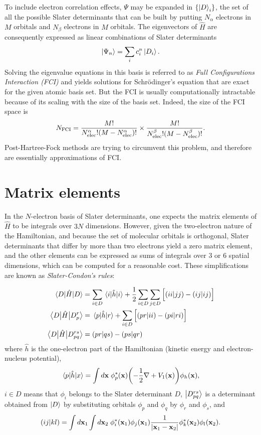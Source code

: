 \documentclass[./thesis.tex]{subfiles}
\begin{document}
To include electron correlation effects, $\Psi$ may be expanded in
$\{\ket D_i \}$, the set of all the possible Slater determinants that can be built by putting $N_\alpha$ electrons in $M$ orbitals and $N_\beta$ electrons in $M$ orbitals.
The eigenvectors of $\widehat{H}$ are consequently expressed as linear combinations of Slater determinants 
\begin{equation}
\ket{\Psi_n} = \sum_{i} c_i^n \ket{D_i}.
\end{equation}
Solving the eigenvalue equations in this basis is referred to as \emph{Full Configurations Interaction (FCI)} and yields solutions for Schrödinger's equation that are exact for the given atomic basis set.
But the FCI is usually computationally intractable because of its scaling with the size of the basis set. Indeed, the size of the FCI space is
\begin{equation}
N_\text{FCI} = \frac{M!}{{N_\text{elec}^\alpha} ! (M-{N_\text{elec}^\alpha})!} \times \frac{M!}{{N_\text{elec}^\beta} ! (M-{N_\text{elec}^\beta})!}.
\end{equation}
Post-Hartree-Fock methods are trying to circumvent this problem, and therefore
are essentially approximations of FCI.

\section{Matrix elements}
In the $N$-electron basis of Slater determinants, one expects the matrix elements of $\widehat H$ to be integrals over $3N$ dimensions.
However, given the two-electron nature of the Hamiltonian, and because the set of molecular orbitals is orthogonal, Slater determinants that differ by more than two electrons yield a zero matrix element, and the other elements can be expressed as sums of integrals over 3 or 6 spatial dimensions, which can be computed for a reasonable cost. These simplifications are known as \emph{Slater-Condon's rules}:

\begin{align}
\mel{D}{\hat{H}}{D} & = \sum_{i\in D} \mel{i}{\hat{h}}{i} + \frac{1}{2} \sum_{i\in D} \sum_{j\in D} \Big [ (ii|jj) - (ij|ij) \Big ]      \\
\mel{D}{\hat{H}}{D_p^r} & = \mel{p}{\hat{h}}{r} + \sum_{i\in D} \Big [ (pr|ii) - (pi|ri) \Big ]        \\
\mel{D}{\hat{H}}{D_{pq}^{rs}} & = (pr|qs) - (ps|qr)
\end{align}
where $\hat{h}$ is the one-electron part of the Hamiltonian (kinetic energy and
electron-nucleus potential),
\begin{equation}
\mel{p}{\hat{h}}{x} = \int d{\bf x}\; \phi^*_p(\mathbf{x}) \qty( -\frac{1}{2}\nabla + V_1(\mathbf{x})) \phi_h(\mathbf{x}),
\end{equation}
$i \in D$ means that $\phi_i$ belongs to the
Slater determinant $D$, $\ket {D_{pq}^{rs}}$ is a determinant obtained from $\ket
D$ by substituting orbitals $\phi_p$ and $\phi_q$ by $\phi_r$ and
$\phi_s$, and
\begin{equation}
(ij|kl) = \int d{\bf x}_1 \int d{\bf x}_2 \; \phi^*_i({\bf x}_1)\phi_j({\bf x}_1) \frac{1}{|{\bf x}_1 - {\bf x}_2|} \phi^*_k({\bf x}_2)\phi_l({\bf x}_2).
\end{equation}
\end{document}
